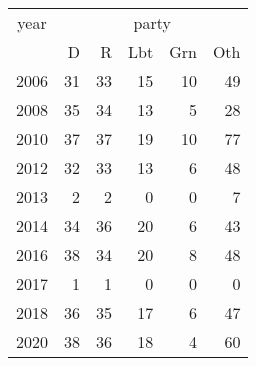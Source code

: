 \footnotesize\begin{tabular}[t]{lrrrrr}
\toprule
\multicolumn{1}{c}{year} & \multicolumn{5}{c}{party} \\
\cmidrule(l{3pt}r{3pt}){1-1} \cmidrule(l{3pt}r{3pt}){2-6}
  & D & R & Lbt & Grn & Oth\\
\midrule
2006 & 31 & 33 & 15 & 10 & 49\\
2008 & 35 & 34 & 13 & 5 & 28\\
2010 & 37 & 37 & 19 & 10 & 77\\
2012 & 32 & 33 & 13 & 6 & 48\\
2013 & 2 & 2 & 0 & 0 & 7\\
2014 & 34 & 36 & 20 & 6 & 43\\
2016 & 38 & 34 & 20 & 8 & 48\\
2017 & 1 & 1 & 0 & 0 & 0\\
2018 & 36 & 35 & 17 & 6 & 47\\
2020 & 38 & 36 & 18 & 4 & 60\\
\bottomrule
\end{tabular}
